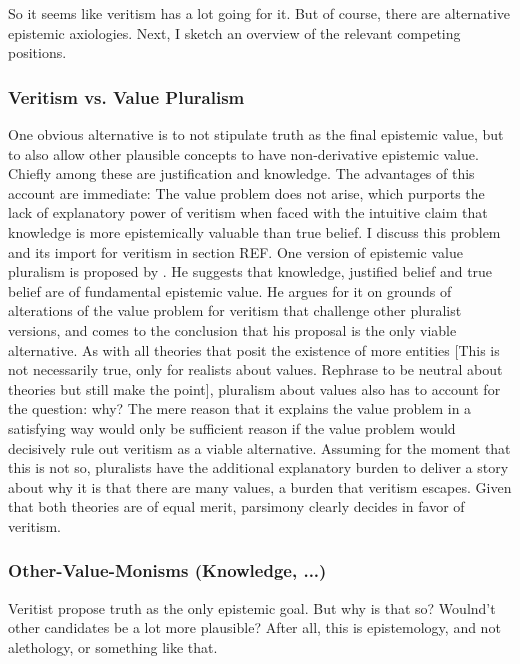 \documentclass[12pt,numbers=noenddot]{scrartcl}
\begin{document}
So it seems like veritism has a lot going for it. But of course, there are alternative epistemic axiologies. Next, I sketch an overview of the relevant competing positions.

\subsubsection{ Veritism vs. Value Pluralism }

One obvious alternative is to not stipulate truth as the final epistemic value, but to also allow other plausible concepts to have non-derivative epistemic value. Chiefly among these are justification and knowledge. The advantages of this account are immediate: The value problem does not arise, which purports the lack of explanatory power of veritism when faced with the intuitive claim that knowledge is more epistemically valuable than true belief. I discuss this problem and its import for veritism in section REF. One version of epistemic value pluralism is proposed by \textcite[399]{Matheson2011-MATHTB-2}. He suggests that knowledge, justified belief and true belief are of fundamental epistemic value. He argues for it on grounds of alterations of the value problem for veritism that challenge other pluralist versions, and comes to the conclusion that his proposal is the only viable alternative.
As with all theories that posit the existence of more entities [This is not necessarily true, only for realists about values. Rephrase to be neutral about theories but still make the point], pluralism about values also has to account for the question: why? The mere reason that it explains the value problem in a satisfying way would only be sufficient reason if the value problem would decisively rule out veritism as a viable alternative. Assuming for the moment that this is not so, pluralists have the additional explanatory burden to deliver a story about why it is that there are many values, a burden that veritism escapes. Given that both theories are of equal merit, parsimony clearly decides in favor of veritism.

\subsubsection{ Other-Value-Monisms (Knowledge, ...) }

    Veritist propose truth as the only epistemic goal. But why is that so? Woulnd't other candidates be a lot more plausible? After all, this is epistemology, and not alethology, or something like that.
\end{document}
